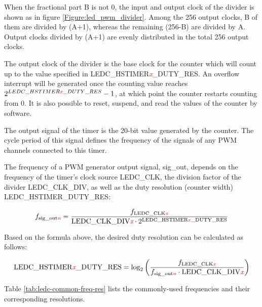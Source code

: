 \documentclass[main\_\_EN.tex]{subfiles}
\begin{document}
When the fractional part B is not 0, the input and output clock of the divider is shown as in figure \ref{Figure:led_pwm_divider}. Among the 256 output clocks, B of them are divided by (A+1), whereas the remaining (256-B) are divided by A. Output clocks divided by (A+1) are evenly distributed in the total 256 output clocks.

The output clock of the divider is the base clock for the counter which will count up to the value specified in LEDC\_HSTIMER\textcolor{red}{\it{x}}\_DUTY\_RES. An overflow interrupt will be generated once the counting value reaches\\ $2^{LEDC\_HSTIMER\textcolor{red}{x}\_DUTY\_RES}-1$, at which point the counter restarts counting from 0. It is also possible to reset, suspend, and read the values of the counter by software.

The output signal of the timer is the 20-bit value generated by the counter. The cycle period of this signal defines the frequency of the signals of any PWM channels connected to this timer.

The frequency of a PWM generator output signal, sig\_out, depends on the frequency of the timer’s clock source LEDC\_CLK, the division factor of the divider LEDC\_CLK\_DIV, as well as the duty resolution (counter width) LEDC\_HSTIMER\_DUTY\_RES:

    \[
    f_{\textrm{sig\_out\textcolor{red}{\it{n}}}}=\frac{f_{\textrm{LEDC\_CLK\textcolor{red}{\it{x}}}}}
                        {\textrm{LEDC\_CLK\_DIV\textcolor{red}{\it{x}}}\cdot 2^{\textrm{LEDC\_HSTIMER}\textcolor{red}{\it{x}}\_\textrm{DUTY\_RES}}}
    \]

Based on the formula above, the desired duty resolution can be calculated as follows:

    \[
    \textrm{LEDC\_HSTIMER}\textcolor{red}{\it{x}}\_\textrm{DUTY\_RES}
    =\log_2\left(\frac{f_{\textrm{LEDC\_CLK\textcolor{red}{\it{x}}}}}
    {f_{\textrm{sig\_out\textcolor{red}{\it{n}}}}\cdot \textrm{LEDC\_CLK\_DIV\textcolor{red}{\it{x}}}}\right)
    \]

Table \ref{tab:ledc-common-freq-res} lists the commonly-used frequencies and their corresponding resolutions.
\end{document}

